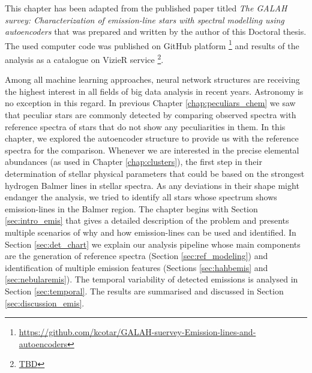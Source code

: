 This chapter has been adapted from the published paper titled \textit{The GALAH survey: Characterization of emission-line stars with spectral modelling using autoencoders} \citep{} that was prepared and written by the author of this Doctoral thesis. The used computer code was published on GitHub platform \footnote{\url{https://github.com/kcotar/GALAH-suervey-Emission-lines-and-autoencoders}} and results of the analysis as a catalogue on VizieR service \footnote{\url{TBD}}.

Among all machine learning approaches, neural network structures are receiving the highest interest in all fields of big data analysis in recent years. Astronomy is no exception in this regard. In previous Chapter \ref{chap:peculiars_chem} we saw that peculiar stars are commonly detected by comparing observed spectra with reference spectra of stars that do not show any peculiarities in them. In this chapter, we explored the autoencoder structure to provide us with the reference spectra for the comparison. Whenever we are interested in the precise elemental abundances (as used in Chapter \ref{chap:clusters}), the first step in their determination of stellar physical parameters that could be based on the strongest hydrogen Balmer lines in stellar spectra. As any deviations in their shape might endanger the analysis, we tried to identify all stars whose spectrum shows emission-lines in the Balmer region. The chapter begins with Section \ref{sec:intro_emis} that gives a detailed description of the problem and presents multiple scenarios of why and how emission-lines can be used and identified. In Section \ref{sec:det_chart} we explain our analysis pipeline whose main components are the generation of reference spectra (Section \ref{sec:ref_modeling}) and identification of multiple emission features (Sections \ref{sec:hahbemis} and \ref{sec:nebularemis}). The temporal variability of detected emissions is analysed in Section \ref{sec:temporal}. The results are summarised and discussed in Section \ref{sec:discussion_emis}.

